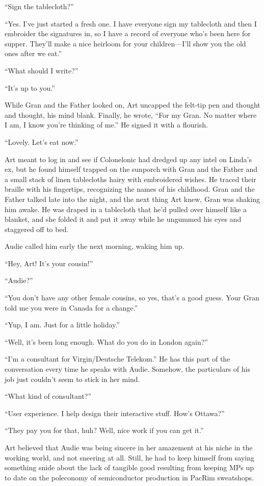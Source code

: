 “Sign the tablecloth?”

“Yes. I’ve just started a fresh one. I have everyone sign my
tablecloth and then I embroider the signatures in, so I have a
record of everyone who’s been here for supper. They’ll make a nice
heirloom for your children—I’ll show you the old ones after we
eat.”

“What should I write?”

“It’s up to you.”

While Gran and the Father looked on, Art uncapped the felt-tip pen
and thought and thought, his mind blank. Finally, he wrote, “For my
Gran. No matter where I am, I know you’re thinking of me.” He
signed it with a flourish.

“Lovely. Let’s eat now.”

Art meant to log in and see if Colonelonic had dredged up any intel
on Linda’s ex, but he found himself trapped on the sunporch with
Gran and the Father and a small stack of linen tablecloths hairy
with embroidered wishes. He traced their braille with his
fingertips, recognizing the names of his childhood. Gran and the
Father talked late into the night, and the next thing Art knew,
Gran was shaking him awake. He was draped in a tablecloth that he’d
pulled over himself like a blanket, and she folded it and put it
away while he ungummed his eyes and staggered off to bed.

Audie called him early the next morning, waking him up.

“Hey, Art! It’s your cousin!”

“Audie?”

“You don’t have any other female cousins, so yes, that’s a good
guess. Your Gran told me you were in Canada for a change.”

“Yup, I am. Just for a little holiday.”

“Well, it’s been long enough. What do you do in London again?”

“I’m a consultant for Virgin/Deutsche Telekom.” He has this part of
the conversation every time he speaks with Audie. Somehow, the
particulars of his job just couldn’t seem to stick in her mind.

“What kind of consultant?”

“User experience. I help design their interactive stuff. How’s
Ottawa?”

“They pay you for that, huh? Well, nice work if you can get it.”

Art believed that Audie was being sincere in her amazement at his
niche in the working world, and not sneering at all. Still, he had
to keep himself from saying something snide about the lack of
tangible good resulting from keeping MPs up to date on the
poleconomy of semiconductor production in PacRim sweatshops.

